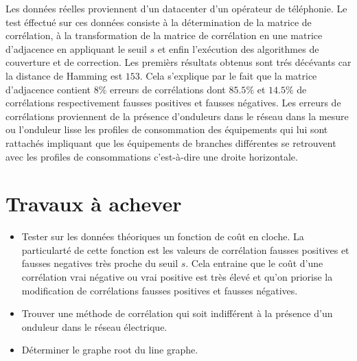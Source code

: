 \documentclass[onecolumn, 12pt]{article}
\begin{document}
Les donn\'ees r\'eelles proviennent d'un datacenter d'un op\'erateur de t\'el\'ephonie.
 Le test \'effectu\'e sur ces donn\'ees consiste \`a la d\'etermination de la matrice de corr\'elation, \`a la transformation de la matrice de corr\'elation en une matrice d'adjacence en appliquant le seuil $s$ et enfin l'ex\'ecution des algorithmes de couverture et de correction. \newline 
 Les premi\`ers r\'esultats obtenus sont tr\'es d\'ec\'evants car la distance de Hamming est $153$. 
 Cela s'explique par le fait que la matrice d'adjacence contient $8\%$ erreurs de corr\'elations dont $85.5\%$ et $14.5\%$ de corr\'elations respectivement fausses positives et fausses n\'egatives. 
 Les erreurs de corr\'elations proviennent de la pr\'esence d'onduleurs dans le r\'eseau dans la mesure ou l'onduleur lisse les profiles de consommation des \'equipements qui lui sont rattach\'es impliquant que les \'equipements de branches diff\'erentes se retrouvent avec les profiles de consommations c'est-\`a-dire une droite horizontale.


\section{Travaux \`a achever}
\begin{itemize}
	\item Tester sur les donn\'ees th\'eoriques un fonction de co\^ut en cloche. La particulart\'e de cette fonction est les valeurs de corr\'elation fausses positives et fausses negatives tr\`es proche du seuil $s$. Cela entraine que le co\^ut d'une corr\'elation vrai n\'egative ou vrai positive est tr\`es \'elev\'e et qu'on priorise la modification de corr\'elations fausses positives et fausses n\'egatives.
	\item Trouver une m\'ethode de corr\'elation qui soit indiff\'erent \`a la pr\'esence d'un onduleur dans le r\'eseau \'electrique.
	\item D\'eterminer le graphe root du line graphe.
\end{itemize}



\end{document}
